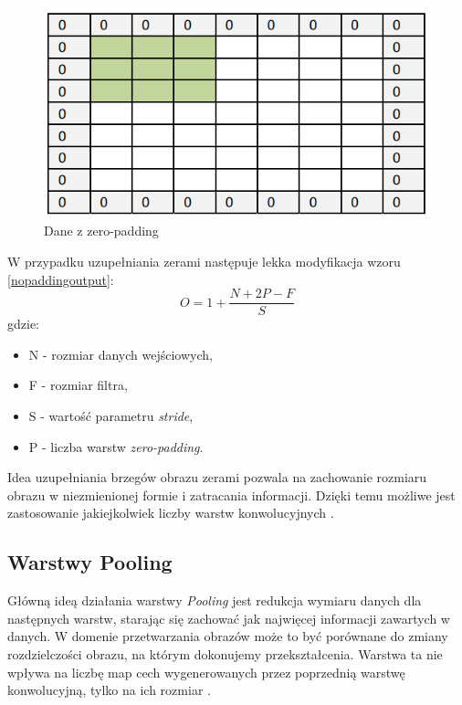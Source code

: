 \documentclass[a4paper,12pt,oneside]{book} %
\begin{document}
\begin{figure}[h]
	\centering
	\includegraphics[scale=0.45]{padding.png}
	\caption{Dane z zero-padding \cite{8308186}}
	\label{padding}
\end{figure}

W przypadku uzupełniania zerami następuje lekka modyfikacja wzoru \ref{nopaddingoutput}:
\begin{equation}
	O = 1 + \frac{N+2P-F}{S}
	\label{paddingoutput}
\end{equation}
gdzie:
\begin{itemize}
	\item N - rozmiar danych wejściowych,
	\item F - rozmiar filtra,
	\item S - wartość parametru \emph{stride},
	\item P - liczba warstw \emph{zero-padding}.
\end{itemize}

Idea uzupełniania brzegów obrazu zerami pozwala na zachowanie rozmiaru obrazu w niezmienionej formie i zatracania informacji. Dzięki temu możliwe jest zastosowanie jakiejkolwiek liczby warstw konwolucyjnych \cite{8308186}.

\subsection{Warstwy Pooling}
\label{pool}

Główną ideą działania warstwy \emph{Pooling} jest redukcja wymiaru danych dla następnych warstw, starając się zachować jak najwięcej informacji zawartych w danych. W domenie przetwarzania obrazów może to być porównane do zmiany rozdzielczości obrazu, na którym dokonujemy przekształcenia. Warstwa ta nie wpływa na liczbę map cech wygenerowanych przez poprzednią warstwę konwolucyjną, tylko na ich rozmiar \cite{8308186}. 
\end{document}
